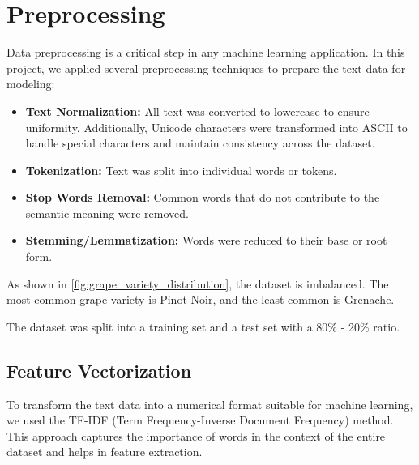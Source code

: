 \section{Preprocessing}
Data preprocessing is a critical step in any 
machine learning application. In this project, 
we applied several preprocessing techniques to 
prepare the text data for modeling:

\begin{itemize}
    \item \textbf{Text Normalization:} 
    All text was converted to lowercase to ensure 
    uniformity. Additionally, Unicode characters were 
    transformed into ASCII to handle special characters 
    and maintain consistency across the dataset.
    \item \textbf{Tokenization:} 
    Text was split into individual words or tokens.
    \item \textbf{Stop Words Removal:} 
    Common words that do not contribute to the 
    semantic meaning were removed.
    \item \textbf{Stemming/Lemmatization:} 
    Words were reduced to their base or root form.
\end{itemize}


As shown in \autoref{fig:grape_variety_distribution},
the dataset is imbalanced. The most common
grape variety is Pinot Noir, and the least common
is Grenache.

The dataset was split into a training set
and a test set with a 80\% - 20\% ratio.

\subsection{Feature Vectorization}
To transform the text data into a numerical format
 suitable for machine learning, we used the TF-IDF 
 (Term Frequency-Inverse Document Frequency) method. 
 This approach captures the importance of words in 
 the context of the entire dataset and helps in feature 
 extraction.